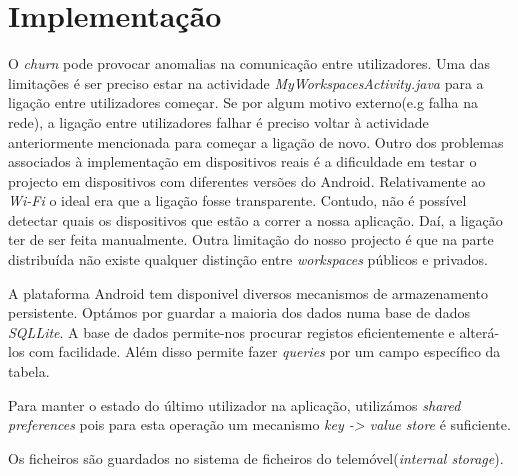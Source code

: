 \section{Implementação}
O \textit{churn} pode provocar anomalias na comunicação entre utilizadores. Uma das limitações é ser preciso estar na actividade \textit{MyWorkspacesActivity.java} para a ligação entre utilizadores começar. Se por algum motivo externo(e.g falha na rede), a ligação entre utilizadores falhar é preciso voltar à actividade anteriormente mencionada para começar a ligação de novo. Outro dos problemas associados à implementação em dispositivos reais é a dificuldade em testar o projecto em dispositivos com diferentes versões do Android. Relativamente ao \textit{Wi-Fi} o ideal era que a ligação fosse transparente. Contudo, não é possível detectar quais os dispositivos que estão a correr a nossa aplicação. Daí, a ligação ter de ser feita manualmente. Outra limitação do nosso projecto é que na parte distribuída não existe qualquer distinção entre \textit{workspaces} públicos e privados.

A plataforma Android tem disponivel diversos mecanismos de armazenamento persistente. Optámos por guardar a maioria dos dados numa base de dados \textit{SQLLite}. A base de dados permite-nos procurar registos eficientemente e alterá-los com facilidade. Além disso permite fazer \textit{queries} por um campo específico da tabela.

Para manter o estado do último utilizador na aplicação, utilizámos \textit{shared preferences} pois para esta operação um mecanismo \textit{key -> value store} é suficiente.

Os ficheiros são guardados no sistema de ficheiros do telemóvel(\textit{internal storage}). 


